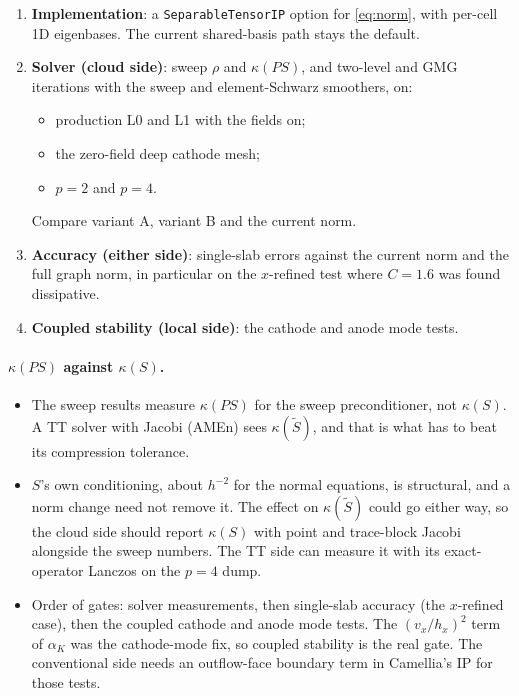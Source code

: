 \documentclass[11pt]{article}
\theoremstyle{remark}
\begin{document}
\begin{enumerate}[nosep]
  \item \textbf{Implementation}: a \texttt{SeparableTensorIP} option for \eqref{eq:norm}, with per-cell 1D
        eigenbases.  The current shared-basis path stays the default.
  \item \textbf{Solver (cloud side)}: sweep $\rho$ and $\kappa(PS)$, and two-level and GMG iterations with the sweep
        and element-Schwarz smoothers, on:
        \begin{itemize}[nosep]
          \item production L0 and L1 with the fields on;
          \item the zero-field deep cathode mesh;
          \item $p=2$ and $p=4$.
        \end{itemize}
        Compare variant A, variant B and the current norm.
  \item \textbf{Accuracy (either side)}: single-slab errors against the current norm and the full graph norm, in
        particular on the $x$-refined test where $C=1.6$ was found dissipative.
  \item \textbf{Coupled stability (local side)}: the cathode and anode mode tests.
\end{enumerate}

\paragraph{$\kappa(PS)$ against $\kappa(S)$.}
\begin{itemize}[nosep]
  \item The sweep results measure $\kappa(PS)$ for the sweep preconditioner, not $\kappa(S)$.  A TT solver with Jacobi
        (AMEn) sees $\kappa(\widetilde S)$, and that is what has to beat its compression tolerance.
  \item $S$'s own conditioning, about $h^{-2}$ for the normal equations, is structural, and a norm change need not remove
        it.  The effect on $\kappa(\widetilde S)$ could go either way, so the cloud side should report $\kappa(S)$ with point
        and trace-block Jacobi alongside the sweep numbers.  The TT side can measure it with its exact-operator Lanczos on
        the $p=4$ dump.
  \item Order of gates: solver measurements, then single-slab accuracy (the $x$-refined case), then the coupled cathode
        and anode mode tests.  The $(v_x/h_x)^2$ term of $\alpha_K$ was the cathode-mode fix, so coupled stability is
        the real gate.  The conventional side needs an outflow-face boundary term in Camellia's IP for those tests.
\end{itemize}
\end{document}
